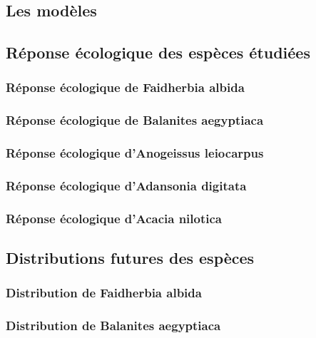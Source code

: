 \documentclass[a4paper, oneside, 12pt]{book}
\begin{document}
\subsection{Les modèles}
\subsection{Réponse écologique des espèces étudiées}
\subsubsection{Réponse écologique de Faidherbia albida}
\subsubsection{Réponse écologique de Balanites aegyptiaca}
\subsubsection{Réponse écologique d'Anogeissus leiocarpus}
\subsubsection{Réponse écologique d'Adansonia digitata}
\subsubsection{Réponse écologique d'Acacia nilotica}
\subsection{Distributions futures des espèces}
\subsubsection{Distribution de Faidherbia albida}
\subsubsection{Distribution de Balanites aegyptiaca}
\end{document}
